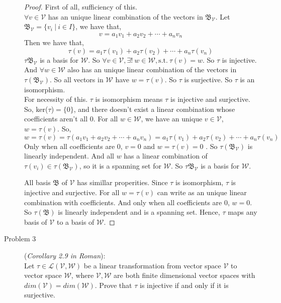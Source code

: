 \documentclass[a4paper]{article}
\begin{document}
\begin{description}
\begin{proof}
First of all, sufficiency of this.\\
$\forall v \in \mathcal{V}$ has an unique linear combination of the vectors in $\mathfrak{B}_{\mathcal{V}}$. Let $\mathfrak{B}_{\mathcal{V}}=\{v_{i}\  |\ i\in I \}$, we have that,
\begin{equation*}
  v=a_{1}v_{1}+a_{2}v_{2}+\cdots +a_{n}v_{n}
\end{equation*}
Then we have that,
\begin{equation*}
  \tau(v)=a_{1}\tau(v_{1})+a_{2}\tau(v_{2})+\cdots +a_{n}\tau(v_{n})
\end{equation*}
$\tau{\mathfrak{B}_{\mathcal{V}}}$ is a basis for $\mathcal{W}$. So $\forall v \in \mathcal{V}, \exists!\  w \in \mathcal{W}, \text{s.t.}\ \tau(v)=w$. So $\tau$ is injective.
And $\forall w \in \mathcal{W}$ also has an unique linear combination of the vectors in $\tau(\mathfrak{B}_{\mathcal{V}})$. So all vectors in $\mathcal{W}$ have $w=\tau(v)$. So $\tau$
is surjective. So $\tau$ is an isomorphism.\\
For necessity of this. $\tau$ is isomorphism means $\tau$ is injective and surjective. So, ker($\tau$)$=\{0\}$, and there doesn't exist a linear combination whose coefficients aren't all $0$.
For all $w\in \mathcal{W}$, we have an unique $v\in \mathcal{V}$, $w=\tau(v)$. So, $$w=\tau(v)=\tau(a_{1}v_{1}+a_{2}v_{2}+\cdots +a_{n}v_{n})=a_{1}\tau(v_{1})+a_{2}\tau(v_{2})+\cdots +a_{n}\tau(v_{n})$$
Only when all coefficients are $0$, $v=0$ and $w=\tau(v)=0$ . So $\tau(\mathfrak{B}_{\mathcal{V}})$ is linearly independent. And all $w$ has a linear combination of $\tau(v_{i})\in \tau(\mathfrak{B}_{\mathcal{V}})$, so it is a spanning set for $\mathcal{W}$. So $\tau\mathfrak{B}_\mathcal{V}$ is a basis for $\mathcal{W}$.

All basis $\mathfrak{B}$ of $\mathcal{V}$ has simillar properities. Since $\tau$ is isomorphism, $\tau$ is injective and surjective. For all $w=\tau(v)$ can write as an unique linear combination with coefficients. And only when all coefficients are $0$, $w=0$. So $\tau(\mathfrak{B})$ is linearly independent and is a spanning set. Hence, $\tau$ maps any basis of $\mathcal{V}$ to a basis of $\mathcal{W}$.
\end{proof}

\item[Problem 3](\textit{Corollary 2.9 in Roman}):\\
Let $\tau \in \mathcal{L}(\mathcal{V},\mathcal{W})$ be a linear transformation from vector space $\mathcal{V}$ to vector space $\mathcal{W}$, where $\mathcal{V},\mathcal{W}$ are both finite dimensional vector spaces with $dim(\mathcal{V})=dim(\mathcal{W})$. Prove that $\tau$ is injective if and only if it is surjective.


\end{description}
\end{document}
